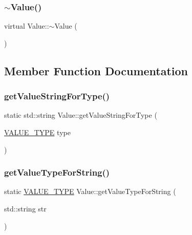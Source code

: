 \subsubsection{\texorpdfstring{$\sim$\+Value()}{~Value()}}
{\footnotesize\ttfamily virtual Value\+::$\sim$\+Value (\begin{DoxyParamCaption}{ }\end{DoxyParamCaption})\hspace{0.3cm}{\ttfamily [virtual]}}



\subsection{Member Function Documentation}
\mbox{\label{classValue_ad1e0a7607c63edbe77251059d433914e}} 
\subsubsection{\texorpdfstring{get\+Value\+String\+For\+Type()}{getValueStringForType()}}
{\footnotesize\ttfamily static std\+::string Value\+::get\+Value\+String\+For\+Type (\begin{DoxyParamCaption}\item[{\hyperlink{statics_8h_a0674a913b8e8c8a9f265baab3646b565}{V\+A\+L\+U\+E\+\_\+\+T\+Y\+PE}}]{type }\end{DoxyParamCaption})\hspace{0.3cm}{\ttfamily [static]}}

\mbox{\label{classValue_a4f772a945a39235b058b18cc187f64a8}} 
\subsubsection{\texorpdfstring{get\+Value\+Type\+For\+String()}{getValueTypeForString()}}
{\footnotesize\ttfamily static \hyperlink{statics_8h_a0674a913b8e8c8a9f265baab3646b565}{V\+A\+L\+U\+E\+\_\+\+T\+Y\+PE} Value\+::get\+Value\+Type\+For\+String (\begin{DoxyParamCaption}\item[{std\+::string}]{str }\end{DoxyParamCaption})\hspace{0.3cm}{\ttfamily [static]}}

